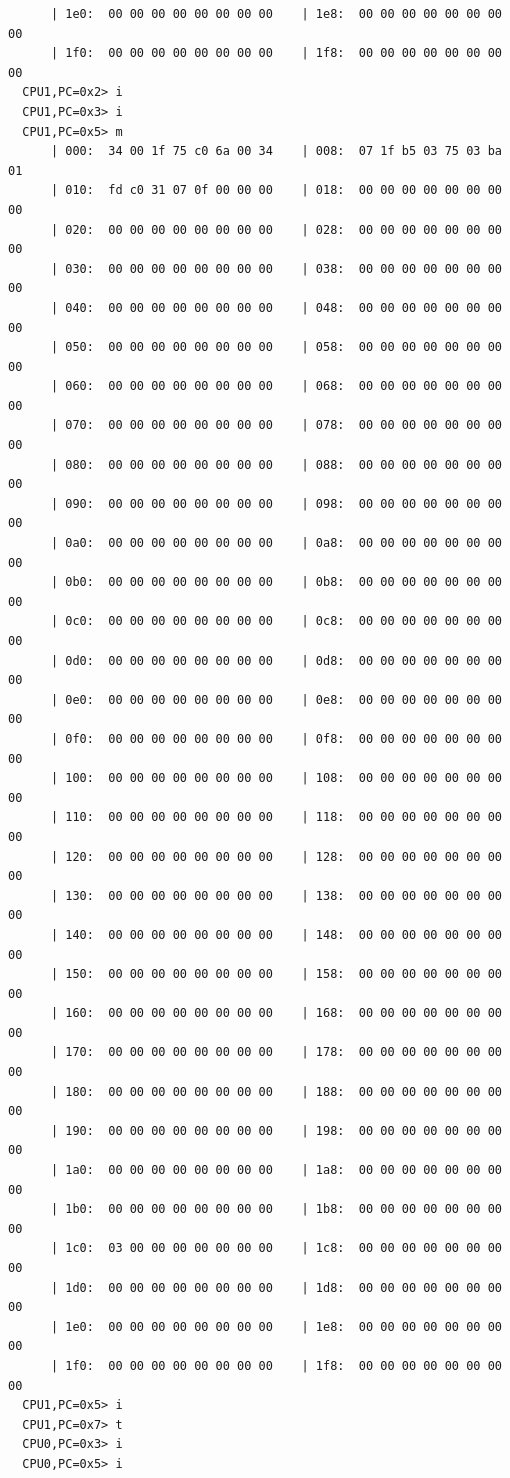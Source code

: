 \documentclass[dvipdfmx]{jsarticle}
\begin{document}
\begin{verbatim}
      | 1e0:  00 00 00 00 00 00 00 00    | 1e8:  00 00 00 00 00 00 00 00
      | 1f0:  00 00 00 00 00 00 00 00    | 1f8:  00 00 00 00 00 00 00 00
  CPU1,PC=0x2> i
  CPU1,PC=0x3> i
  CPU1,PC=0x5> m
      | 000:  34 00 1f 75 c0 6a 00 34    | 008:  07 1f b5 03 75 03 ba 01
      | 010:  fd c0 31 07 0f 00 00 00    | 018:  00 00 00 00 00 00 00 00
      | 020:  00 00 00 00 00 00 00 00    | 028:  00 00 00 00 00 00 00 00
      | 030:  00 00 00 00 00 00 00 00    | 038:  00 00 00 00 00 00 00 00
      | 040:  00 00 00 00 00 00 00 00    | 048:  00 00 00 00 00 00 00 00
      | 050:  00 00 00 00 00 00 00 00    | 058:  00 00 00 00 00 00 00 00
      | 060:  00 00 00 00 00 00 00 00    | 068:  00 00 00 00 00 00 00 00
      | 070:  00 00 00 00 00 00 00 00    | 078:  00 00 00 00 00 00 00 00
      | 080:  00 00 00 00 00 00 00 00    | 088:  00 00 00 00 00 00 00 00
      | 090:  00 00 00 00 00 00 00 00    | 098:  00 00 00 00 00 00 00 00
      | 0a0:  00 00 00 00 00 00 00 00    | 0a8:  00 00 00 00 00 00 00 00
      | 0b0:  00 00 00 00 00 00 00 00    | 0b8:  00 00 00 00 00 00 00 00
      | 0c0:  00 00 00 00 00 00 00 00    | 0c8:  00 00 00 00 00 00 00 00
      | 0d0:  00 00 00 00 00 00 00 00    | 0d8:  00 00 00 00 00 00 00 00
      | 0e0:  00 00 00 00 00 00 00 00    | 0e8:  00 00 00 00 00 00 00 00
      | 0f0:  00 00 00 00 00 00 00 00    | 0f8:  00 00 00 00 00 00 00 00
      | 100:  00 00 00 00 00 00 00 00    | 108:  00 00 00 00 00 00 00 00
      | 110:  00 00 00 00 00 00 00 00    | 118:  00 00 00 00 00 00 00 00
      | 120:  00 00 00 00 00 00 00 00    | 128:  00 00 00 00 00 00 00 00
      | 130:  00 00 00 00 00 00 00 00    | 138:  00 00 00 00 00 00 00 00
      | 140:  00 00 00 00 00 00 00 00    | 148:  00 00 00 00 00 00 00 00
      | 150:  00 00 00 00 00 00 00 00    | 158:  00 00 00 00 00 00 00 00
      | 160:  00 00 00 00 00 00 00 00    | 168:  00 00 00 00 00 00 00 00
      | 170:  00 00 00 00 00 00 00 00    | 178:  00 00 00 00 00 00 00 00
      | 180:  00 00 00 00 00 00 00 00    | 188:  00 00 00 00 00 00 00 00
      | 190:  00 00 00 00 00 00 00 00    | 198:  00 00 00 00 00 00 00 00
      | 1a0:  00 00 00 00 00 00 00 00    | 1a8:  00 00 00 00 00 00 00 00
      | 1b0:  00 00 00 00 00 00 00 00    | 1b8:  00 00 00 00 00 00 00 00
      | 1c0:  03 00 00 00 00 00 00 00    | 1c8:  00 00 00 00 00 00 00 00
      | 1d0:  00 00 00 00 00 00 00 00    | 1d8:  00 00 00 00 00 00 00 00
      | 1e0:  00 00 00 00 00 00 00 00    | 1e8:  00 00 00 00 00 00 00 00
      | 1f0:  00 00 00 00 00 00 00 00    | 1f8:  00 00 00 00 00 00 00 00
  CPU1,PC=0x5> i
  CPU1,PC=0x7> t
  CPU0,PC=0x3> i
  CPU0,PC=0x5> i

\end{verbatim}
\end{document}
